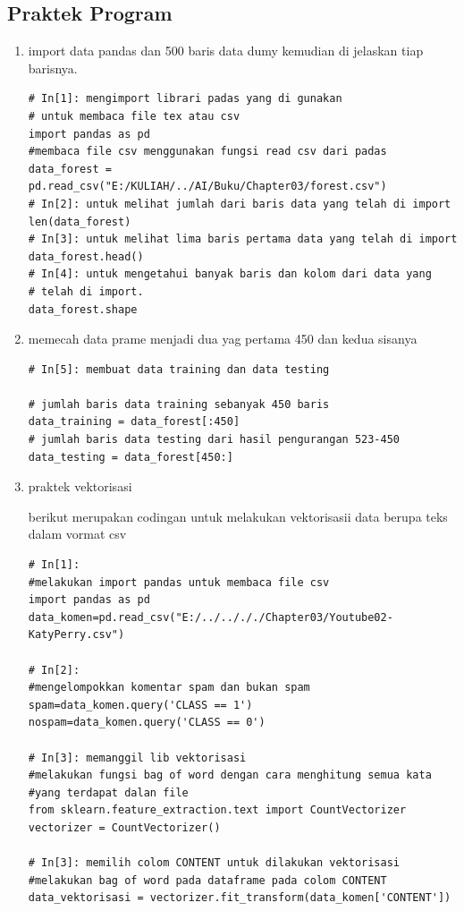 \subsection{Praktek Program}
\begin{enumerate}
\item import data pandas dan 500 baris data dumy kemudian di jelaskan tiap barisnya.
\begin{verbatim}
# In[1]: mengimport librari padas yang di gunakan
# untuk membaca file tex atau csv
import pandas as pd
#membaca file csv menggunakan fungsi read csv dari padas
data_forest = pd.read_csv("E:/KULIAH/../AI/Buku/Chapter03/forest.csv")
# In[2]: untuk melihat jumlah dari baris data yang telah di import
len(data_forest)
# In[3]: untuk melihat lima baris pertama data yang telah di import
data_forest.head()
# In[4]: untuk mengetahui banyak baris dan kolom dari data yang
# telah di import.
data_forest.shape
\end{verbatim}

\item memecah data prame menjadi dua yag pertama 450 dan kedua sisanya
\begin{verbatim}
# In[5]: membuat data training dan data testing

# jumlah baris data training sebanyak 450 baris
data_training = data_forest[:450]
# jumlah baris data testing dari hasil pengurangan 523-450
data_testing = data_forest[450:]
\end{verbatim}

\item praktek vektorisasi\par
berikut merupakan codingan untuk melakukan vektorisasii data berupa teks dalam vormat csv
\begin{verbatim}
# In[1]: 
#melakukan import pandas untuk membaca file csv
import pandas as pd
data_komen=pd.read_csv("E:/../../././Chapter03/Youtube02-KatyPerry.csv")

# In[2]: 
#mengelompokkan komentar spam dan bukan spam 
spam=data_komen.query('CLASS == 1')
nospam=data_komen.query('CLASS == 0')

# In[3]: memanggil lib vektorisasi
#melakukan fungsi bag of word dengan cara menghitung semua kata 
#yang terdapat dalan file
from sklearn.feature_extraction.text import CountVectorizer
vectorizer = CountVectorizer()

# In[3]: memilih colom CONTENT untuk dilakukan vektorisasi
#melakukan bag of word pada dataframe pada colom CONTENT
data_vektorisasi = vectorizer.fit_transform(data_komen['CONTENT'])


\end{verbatim}
\end{enumerate}

